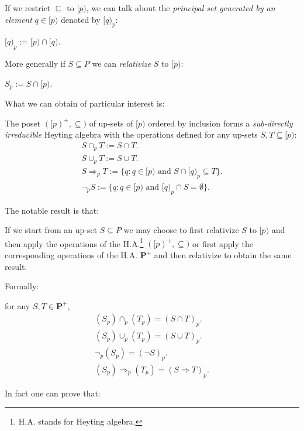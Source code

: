 If we restrict $\sqsubseteq$ to $[p)$, we can talk about the \emph{principal set generated by an element}
$q \in [p)$ denoted by $[q)_p$:

\begin{definition}
	$[q)_p := [p) \cap [q)$.
\end{definition}

More generally if $S \subseteq P$ we can \emph{relativize} $S$ to $[p)$:

\begin{definition}
	$S_p := S \cap [p)$.
\end{definition}


What we can obtain of particular interest is:

\begin{prop}
	The poset $([p)^+, \subseteq)$ of up-sets of $[p)$ ordered by inclusion forms a \emph{sub-directly irreducible} Heyting algebra with the operations defined for any up-sets $S,T \subseteq [p)$:
	\begin{gather*}
		S \cap_p T := S \cap T. \\
		S \cup_p T := S \cup T. \\
		S \Rightarrow_p T := \{q: q \in [p) \text{ and } S \cap [q)_p \subseteq T\}. \\
		\neg_p S := \{q: q \in [p) \text{ and } [q)_p \cap S = \emptyset\}.
	\end{gather*}
\end{prop} 

The notable result is that:

	If we start from an up-set $S \subseteq P$ we may choose to first relativize $S$ to $[p)$ and then apply the operations of the H.A.\footnote{H.A. stands for Heyting algebra.}  $([p)^+, \subseteq)$ or first apply the corresponding operations of the H.A. $\textbf{P}^+$ and then relativize to obtain the same result. 
	
Formally:	
\begin{lem}
	for any $S,T \in \textbf{P}^+$,
	\begin{gather*}
		(S_p) \cap_p (T_p) = (S \cap T)_p. \\
		(S_p) \cup_p (T_p) = (S \cup T)_p.\\
		\neg_p(S_p) = (\neg S)_p. \\
		(S_p) \Rightarrow_p (T_p) = (S \Rightarrow T)_p.
	\end{gather*}
\end{lem}	
	  
In fact one can prove that:

